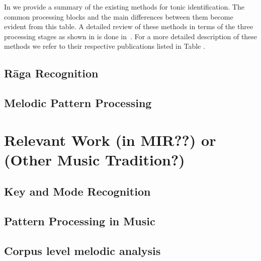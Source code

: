 {	
In  we provide a summary of the existing methods for tonic identification. The common processing blocks and the main differences between them become evident from this table. A detailed review of these methods in terms of the three processing stages as shown in  is done in~\cite{Gulati2014Tonic}. For a more detailed description of these methods we refer to their respective publications listed in Table . 




\subsection{R\={a}ga Recognition}

\subsection{Melodic Pattern Processing}



\section{Relevant Work (in MIR??) or (Other Music Tradition?)}
\label{sec:background_relevant_work_other_music}

\subsection{Key and Mode Recognition}

\subsection{Pattern Processing in Music}




\subsection{Corpus level melodic analysis}


}
